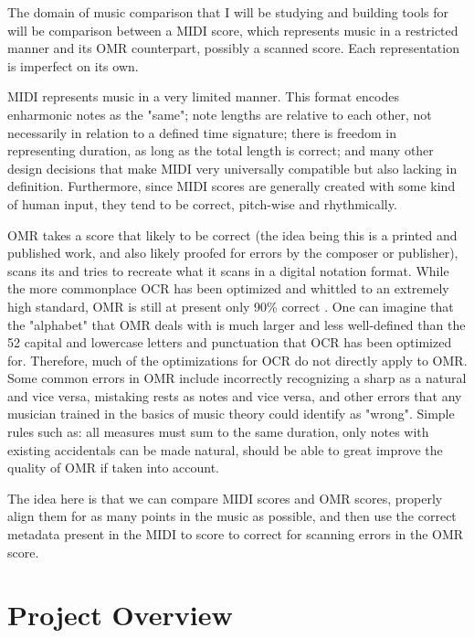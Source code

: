 The domain of music comparison that I will be studying and building tools for will be comparison between a MIDI score, which represents music in a restricted manner and its OMR counterpart, possibly a scanned score. Each representation is imperfect on its own.

MIDI represents music in a very limited manner. This format encodes enharmonic notes as the "same"; note lengths are relative to each other, not necessarily in relation to a defined time signature; there is freedom in representing duration, as long as the total length is correct; and many other design decisions that make MIDI very universally compatible but also lacking in definition. Furthermore, since MIDI scores are generally created with some kind of human input, they tend to be correct, pitch-wise and rhythmically. 
 
OMR takes a score that likely to be correct (the idea being this is a printed and published work, and also likely proofed for errors by the composer or publisher), scans its and tries to recreate what it scans in a digital notation format. While the more commonplace OCR has been optimized and whittled to an extremely high standard, OMR is still at present only 90\% correct \cite{church}. One can imagine that the "alphabet" that OMR deals with is much larger and less well-defined than the 52 capital and lowercase letters and punctuation that OCR has been optimized for. Therefore, much of the optimizations for OCR do not directly apply to OMR. Some common errors in OMR include incorrectly recognizing a sharp as a natural and vice versa, mistaking rests as notes and vice versa, and other errors that any musician trained in the basics of music theory could identify as "wrong". Simple rules such as: all measures must sum to the same duration, only notes with existing accidentals can be made natural, should be able to great improve the quality of OMR if taken into account.

The idea here is that we can compare MIDI scores and OMR scores, properly align them for as many points in the music as possible, and then use the correct metadata present in the MIDI to score to correct for scanning errors in the OMR score. 


\section{Project Overview}


